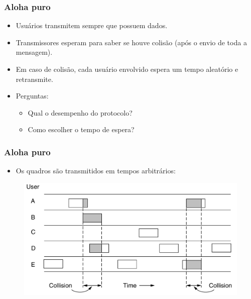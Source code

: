 \begin{frame}
	\frametitle{Aloha puro}

	\begin{itemize}
		\item Usuários transmitem sempre que possuem dados.
		\item Transmissores esperam para saber se houve colisão (após o envio de toda a mensagem).
		\item Em caso de colisão, cada usuário envolvido espera um tempo aleatório e retransmite.
		\item Perguntas:
		\begin{itemize}
			\item Qual o desempenho do protocolo?
			\item Como escolher o tempo de espera?
		\end{itemize}
	\end{itemize}
\end{frame}

\begin{frame}
	\frametitle{Aloha puro}

	\begin{itemize}
		\item Os quadros são transmitidos em tempos arbitrários:
	\end{itemize}
	
	\begin{figure}[t]
		\begin{center}
			\includegraphics[width=0.7\columnwidth]{figs/fig04-01}
		\end{center}
	\end{figure}
	
\end{frame}

